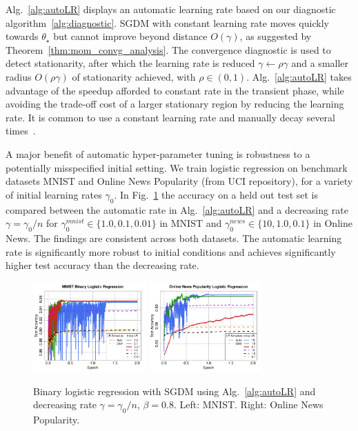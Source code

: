 \documentclass[conference]{IEEEtran}
\begin{document}
Alg.~\ref{alg:autoLR} displays an automatic learning rate based on our diagnostic algorithm~\ref{alg:diagnostic}.
SGDM with constant learning rate moves quickly towards $\theta_\star$ but cannot improve beyond distance $O(\gamma)$, as suggested by Theorem~\ref{thm:mom_convg_analysis}.
The convergence diagnostic is used to detect stationarity, after which the learning rate is reduced $\gamma \gets \rho \gamma$ and a smaller radius $O(\rho \gamma)$ of stationarity achieved, with $\rho \in (0,1)$. Alg.~\ref{alg:autoLR} takes advantage of the speedup afforded to constant rate in the transient phase, while avoiding the trade-off cost of a larger stationary region by reducing the learning rate. 
It is common to use a constant learning rate and manually decay several times~\cite{Proc:He_CVPR16,Article:Krizhevsky_CACM17}.

A major benefit of automatic hyper-parameter tuning is robustness to a potentially misspecified initial setting. 
We train logistic regression on benchmark datasets MNIST and Online News Popularity (from UCI repository), for a variety of initial learning rates $\gamma_0$.
In Fig.~\ref{fig:mnist_news_binary} the accuracy on a held out test set is compared between the automatic rate in Alg.~\ref{alg:autoLR} and a decreasing rate $\gamma = \gamma_0 / n$ for $\gamma_0^{mnist} \in \{1.0, 0.1, 0.01\}$ in MNIST and $\gamma_0^{news} \in \{10, 1.0, 0.1\}$ in Online News.
The findings are consistent across both datasets.
The automatic learning rate is significantly more robust to initial conditions and achieves significantly higher test accuracy than the decreasing rate. 

\begin{figure}[t]
\begin{center}
  \includegraphics[width=1.7in]{fig/mnist_binary.pdf}
\includegraphics[width=1.7in]{fig/news_popularity.pdf}
\end{center}
\vspace{-0.16in}
  \caption{Binary logistic regression  with SGDM using Alg.~\ref{alg:autoLR} and decreasing rate $\gamma = \gamma_0 / n$,
  $\beta = 0.8$. Left: MNIST. Right: Online News Popularity.
  }
\label{fig:mnist_news_binary}\vspace{-0.13in}
\end{figure}
\end{document}
